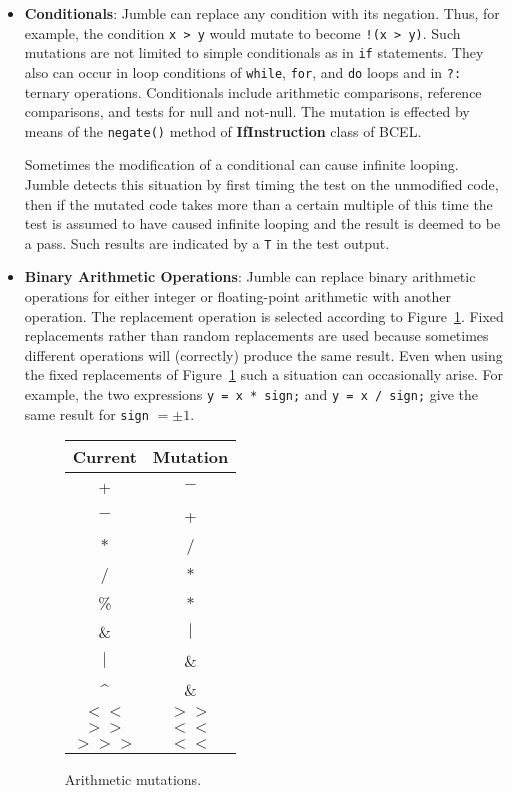 \documentclass{article}
\begin{document}
\begin{itemize}

\item {\bf Conditionals}: Jumble can replace any condition with its negation.  Thus, for example, the condition \verb|x > y| would mutate to become \verb|!(x > y)|. Such mutations are not limited to simple conditionals as in {\tt if} statements. They also can occur in loop conditions of {\tt while}, {\tt for}, and {\tt do} loops and in {\tt ?:} ternary operations. Conditionals include arithmetic comparisons, reference comparisons, and tests for null and not-null. The mutation is effected by means of the {\tt negate()} method of {\bf IfInstruction} class of BCEL.

Sometimes the modification of a conditional can cause infinite looping. Jumble detects this situation by first timing the test on the unmodified code, then if the mutated code takes more than a certain multiple of this time the test is assumed to have caused infinite looping and the result is deemed to be a pass. Such results are indicated by a {\tt T} in the test output.

\item {\bf Binary Arithmetic Operations}: Jumble can replace binary arithmetic operations for either integer or floating-point arithmetic with another operation. The replacement operation is selected according to Figure~\ref{aops}. Fixed replacements rather than random replacements are used because sometimes different operations will (correctly) produce the same result. Even when using the fixed replacements of Figure~\ref{aops} such a situation can occasionally arise. For example, the two expressions \verb|y = x * sign;| and \verb|y = x / sign;| give the same result for \verb|sign| $=\pm1$.

\begin{figure}
\begin{center}
\begin{tabular}{cc}
Current&Mutation\\\hline
+&$-$\\
$-$&+\\
$*$&/\\
/&$*$\\
\%&$*$\\
\&&$|$\\
$|$&\&\\
\^{ }&\&\\
$<<$&$>>$\\
$>>$&$<<$\\
$>>>$&$<<$\\
\end{tabular}
\end{center}
\caption{\label{aops}Arithmetic mutations.}
\end{figure}

\end{itemize}

\small

\end{document}
